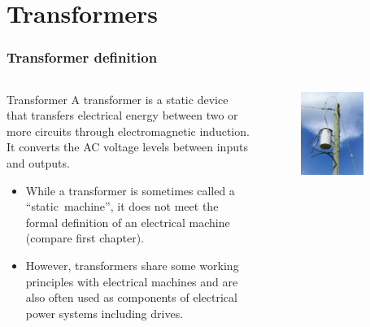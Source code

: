 \section{Transformers}


\begin{frame}
	\frametitle{Transformer definition}
    \begin{columns}
		\begin{column}{0.65\textwidth}
            \begin{varblock}{Transformer}
                A transformer is a static device that transfers electrical energy between two or more circuits through electromagnetic induction. It converts the AC voltage levels between inputs and outputs.   
            \end{varblock}
            \begin{itemize}
                \item<2-> While a transformer is sometimes called a ``static~machine'', it does not meet the formal definition of an electrical machine (compare first chapter).
                \item<3-> However, transformers share some working principles with electrical machines and are also often used as components of electrical power systems including drives.
            \end{itemize}
		\end{column}
        \hfill
		\begin{column}{0.35\textwidth}
			\onslide<1->
			\begin{figure}
				\centering
				\includegraphics[width=0.75\textwidth]{fig/lec04/Transformer_rural_pole.jpg}

\end{figure}
\end{column}
\end{columns}
\end{frame}
